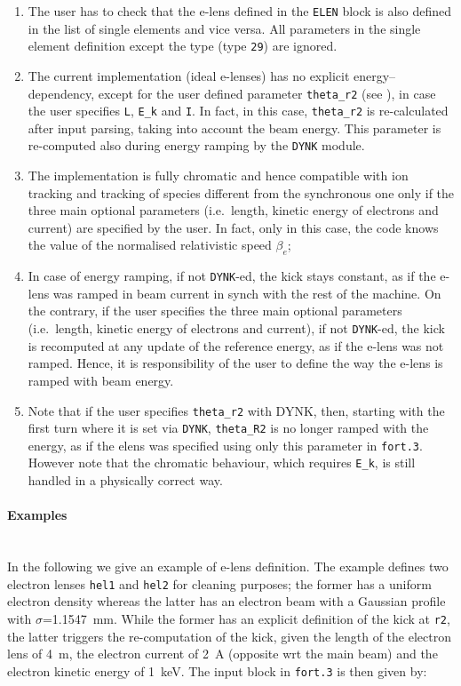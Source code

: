 \begin{enumerate}
\item The user has to check that the e-lens defined in the \texttt{ELEN} block is also defined in the list of single elements and vice versa.
  All parameters in the single element definition except the type (type \texttt{29}) are ignored.
\item The current implementation (ideal e-lenses) has no explicit energy--dependency, except for the user defined parameter \texttt{theta\_r2} (see \cite{sixphys}), in case the user specifies \texttt{L}, \texttt{E\_k} and \texttt{I}.
  In fact, in this case, \texttt{theta\_r2} is re-calculated after input parsing, taking into account the beam energy.
  This parameter is re-computed also during energy ramping by the \texttt{DYNK} module.
\item The implementation is fully chromatic and hence compatible with ion tracking and tracking of species different from the synchronous one only if the three main optional parameters (i.e.\ length, kinetic energy of electrons and current) are specified by the user.
  In fact, only in this case, the code knows the value of the normalised relativistic speed $\beta_e$;
\item In case of energy ramping, if not \texttt{DYNK}-ed, the kick stays constant, as if the e-lens was ramped in beam current in synch with the rest of the machine.
  On the contrary, if the user specifies the three main optional parameters (i.e.~length, kinetic energy of electrons and current), if not \texttt{DYNK}-ed, the kick is recomputed at any update of the reference energy, as if the e-lens was not ramped.
  Hence, it is responsibility of the user to define the way the e-lens is ramped with beam energy.
\item Note that if the user specifies \texttt{theta\_r2} with DYNK, then, starting with the first turn where it is set via \texttt{DYNK}, \texttt{theta\_R2} is no longer ramped with the energy, as if the elens was specified using only this parameter in \texttt{fort.3}.
  However note that the chromatic behaviour, which requires \texttt{E\_k}, is still handled in a physically correct way.
\end{enumerate}

\paragraph{Examples}~\\

In the following we give an example of e-lens definition.
The example defines two electron lenses \texttt{hel1} and \texttt{hel2} for cleaning purposes; the former has a uniform electron density whereas the latter has an electron beam with a Gaussian profile with $\sigma$=1.1547~mm.
While the former has an explicit definition of the kick at \texttt{r2}, the latter triggers the re-computation of the kick, given the length of the electron lens of 4~m, the electron current of 2~A (opposite wrt the main beam) and the electron kinetic energy of 1~keV.
The input block in \texttt{fort.3} is then given by:

